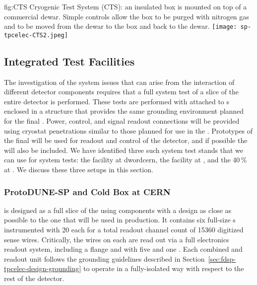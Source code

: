 \begin{dunefigure}
{fig:CTS}
{Cryogenic Test System (CTS): an insulated box is mounted on top of a commercial \lntwo dewar.  Simple controls allow the box to be purged with nitrogen gas and \lntwo to be moved from the dewar to the box and back to the dewar.}
\texttt{[image: sp-tpcelec-CTS2.jpeg]}
\end{dunefigure}


\subsection{Integrated Test Facilities}
\label{sec:fdsp-tpcelec-qa-facilities}

The investigation of the system issues that can arise from the interaction 
of different detector components requires that a full system test of a slice
of the entire detector is performed. These tests are performed with 
attached to s enclosed in a structure that provides the same
grounding environment planned for the final  . 
Power, control, and signal readout connections will be provided using cryostat 
penetrations similar to those planned for use in the  .
Prototypes of the final    will be used for readout and
control of the detector, and if possible the  will also be included.
We have identified three such system test stands
that we can use for system tests: the  facility at dword{cern}, the
 facility at , and the \num{40}\,\%  at .
We discuss these three setups in this section.

\subsubsection{ProtoDUNE-SP and Cold Box at CERN}
\label{sec:fdsp-tpcelec-qa-facilities-pdune}

 is designed as a full slice of the    
using components with a design as close as possible to the one that will
be used in production. It contains six full-size 
 s instrumented with \num{20}  each for a 
total readout channel count of \num{15360} digitized sense wires. Critically, 
the wires on each  are read out via a full  electronics readout 
system, including a  flange and  with five  
and one . Each combined  and  readout unit follows 
the grounding guidelines described in Section~\ref{sec:fdsp-tpcelec-design-grounding} 
to operate in a fully-isolated way with respect to the rest of the detector.

